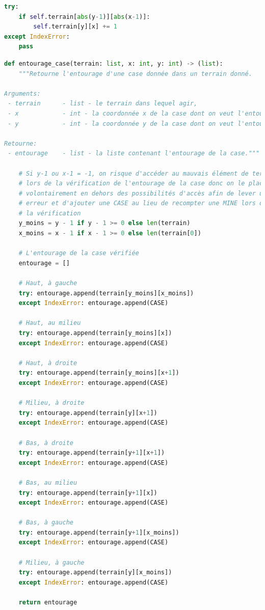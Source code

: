 \documentclass[12pt, a4paper]{article}
\begin{document}
\begin{lstlisting}[language=Python, caption=Second problème d'index]
try:
    if self.terrain[abs(y-1)][abs(x-1)]:
        self.terrain[y][x] += 1
except IndexError:
    pass
\end{lstlisting}

\newpage

\begin{lstlisting}[language=Python, caption=Fonction \emph{entourage\_case}
finale]
def entourage_case(terrain: list, x: int, y: int) -> (list):
    """Retourne l'entourage d'une case donnée dans un terrain donné.

Arguments:
 - terrain      - list - le terrain dans lequel agir,
 - x            - int - la coordonnée x de la case dont on veut l'entourage,
 - y            - int - la coordonnée y de la case dont on veut l'entourage.

Retourne:
 - entourage    - list - la liste contenant l'entourage de la case."""

    # Si y-1 ou x-1 = -1, on risque d'accéder au mauvais élément de terrain
    # lors de la vérification de l'entourage de la case donc on le place
    # volontairement en dehors des possibilités d'accès afin de lever une
    # erreur et d'ajouter une CASE au lieu de recompter une MINE lors de
    # la vérification
    y_moins = y - 1 if y - 1 >= 0 else len(terrain)
    x_moins = x - 1 if x - 1 >= 0 else len(terrain[0])

    # L'entourage de la case vérifiée
    entourage = []

    # Haut, à gauche
    try: entourage.append(terrain[y_moins][x_moins])
    except IndexError: entourage.append(CASE)

    # Haut, au milieu
    try: entourage.append(terrain[y_moins][x])
    except IndexError: entourage.append(CASE)

    # Haut, à droite
    try: entourage.append(terrain[y_moins][x+1])
    except IndexError: entourage.append(CASE)

    # Milieu, à droite
    try: entourage.append(terrain[y][x+1])
    except IndexError: entourage.append(CASE)

    # Bas, à droite
    try: entourage.append(terrain[y+1][x+1])
    except IndexError: entourage.append(CASE)

    # Bas, au milieu
    try: entourage.append(terrain[y+1][x])
    except IndexError: entourage.append(CASE)

    # Bas, à gauche
    try: entourage.append(terrain[y+1][x_moins])
    except IndexError: entourage.append(CASE)

    # Milieu, à gauche
    try: entourage.append(terrain[y][x_moins])
    except IndexError: entourage.append(CASE)

    return entourage
\end{lstlisting}
\end{document}
